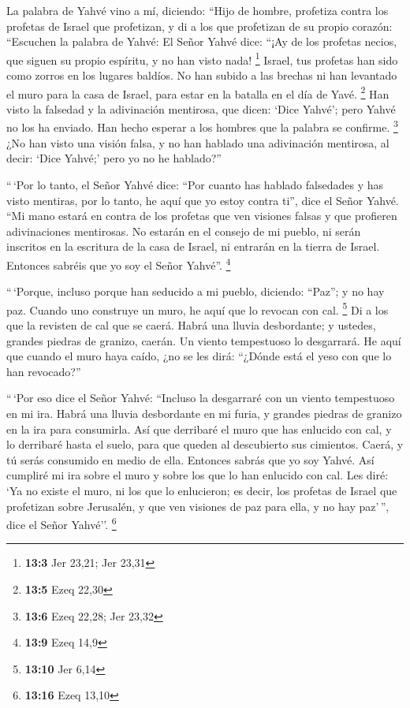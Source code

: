  La palabra de Yahvé vino a mí, diciendo: 
``Hijo de hombre, profetiza contra los profetas de Israel que
profetizan, y di a los que profetizan de su propio corazón: ``Escuchen
la palabra de Yahvé:  El Señor Yahvé dice: ``¡Ay de los
profetas necios, que siguen su propio espíritu, y no han visto nada!
\footnote{\textbf{13:3} Jer 23,21; Jer 23,31}  Israel, tus
profetas han sido como zorros en los lugares baldíos.  No
han subido a las brechas ni han levantado el muro para la casa de
Israel, para estar en la batalla en el día de Yavé. \footnote{\textbf{13:5}
  Ezeq 22,30}  Han visto la falsedad y la adivinación
mentirosa, que dicen: `Dice Yahvé'; pero Yahvé no los ha enviado. Han
hecho esperar a los hombres que la palabra se confirme. \footnote{\textbf{13:6}
  Ezeq 22,28; Jer 23,32}  ¿No han visto una visión falsa,
y no han hablado una adivinación mentirosa, al decir: `Dice Yahvé;' pero
yo no he hablado?''

 ``\,`Por lo tanto, el Señor Yahvé dice: ``Por cuanto has
hablado falsedades y has visto mentiras, por lo tanto, he aquí que yo
estoy contra ti'', dice el Señor Yahvé.  ``Mi mano estará
en contra de los profetas que ven visiones falsas y que profieren
adivinaciones mentirosas. No estarán en el consejo de mi pueblo, ni
serán inscritos en la escritura de la casa de Israel, ni entrarán en la
tierra de Israel. Entonces sabréis que yo soy el Señor Yahvé''.
\footnote{\textbf{13:9} Ezeq 14,9}

 ``\,`Porque, incluso porque han seducido a mi pueblo,
diciendo: ``Paz''; y no hay paz. Cuando uno construye un muro, he aquí
que lo revocan con cal. \footnote{\textbf{13:10} Jer 6,14}
 Di a los que la revisten de cal que se caerá. Habrá una
lluvia desbordante; y ustedes, grandes piedras de granizo, caerán. Un
viento tempestuoso lo desgarrará.  He aquí que cuando el
muro haya caído, ¿no se les dirá: ``¿Dónde está el yeso con que lo han
revocado?''

 ``\,`Por eso dice el Señor Yahvé: ``Incluso la
desgarraré con un viento tempestuoso en mi ira. Habrá una lluvia
desbordante en mi furia, y grandes piedras de granizo en la ira para
consumirla.  Así que derribaré el muro que has enlucido
con cal, y lo derribaré hasta el suelo, para que queden al descubierto
sus cimientos. Caerá, y tú serás consumido en medio de ella. Entonces
sabrás que yo soy Yahvé.  Así cumpliré mi ira sobre el
muro y sobre los que lo han enlucido con cal. Les diré: `Ya no existe el
muro, ni los que lo enlucieron;  es decir, los profetas
de Israel que profetizan sobre Jerusalén, y que ven visiones de paz para
ella, y no hay paz'\,'', dice el Señor Yahvé''. \footnote{\textbf{13:16}
  Ezeq 13,10}

